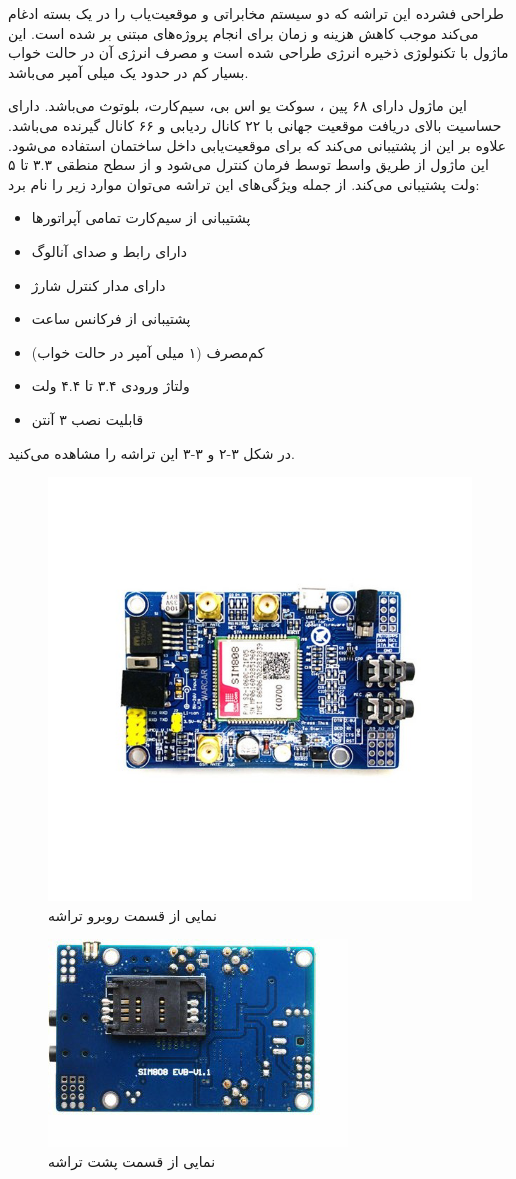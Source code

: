 طراحی فشرده این تراشه که دو سیستم مخابراتی و موقعیت‌یاب را در یک بسته ادغام می‌کند موجب کاهش هزینه و زمان برای انجام پروژه‌های مبتنی بر  شده است. این ماژول با تکنولوژی ذخیره انرژی طراحی شده است و مصرف انرژی آن در حالت خواب بسیار کم در حدود یک میلی آمپر می‌باشد.
 
 
 این ماژول دارای ۶۸ پین ، سوکت یو اس بی، سیم‌کارت، بلوتوث می‌باشد. دارای حساسیت بالای دریافت موقعیت جهانی با ۲۲ کانال ردیابی و ۶۶ کانال گیرنده می‌باشد. علاوه بر این از  پشتیبانی می‌کند که برای موقعیت‌یابی داخل ساختمان استفاده می‌شود. این ماژول از طریق واسط  توسط فرمان  کنترل می‌شود و از سطح منطقی ۳.۳ تا ۵ ولت پشتیبانی می‌کند.
 از جمله ویژگی‌های این تراشه می‌توان موارد زیر را نام برد:
\begin{itemize}
	\item 
	پشتیبانی از سیم‌کارت تمامی آپراتورها
	\item
	دارای رابط  و صدای آنالوگ
	\item
	دارای مدار کنترل شارژ
	\item
	پشتیبانی از فرکانس ساعت
	\item
	کم‌مصرف (۱ میلی آمپر در حالت خواب)
	\item 
	ولتاژ ورودی ۳.۴ تا ۴.۴ ولت
	\item 
	قابلیت نصب ۳ آنتن 
\end{itemize} 
در شکل ۳-۲ و ۳-۳ این تراشه را مشاهده می‌کنید.
\begin{figure}[!h]
	\centerline{\includegraphics[width=.5\textwidth]{frontside-sim808}}
	\caption{نمایی از قسمت روبرو تراشه }
\end{figure}
\begin{figure}[!h]
	\centerline{\includegraphics[width=.5\textwidth]{backside-sim808}}
	\caption{نمایی از قسمت پشت تراشه }
\end{figure}

